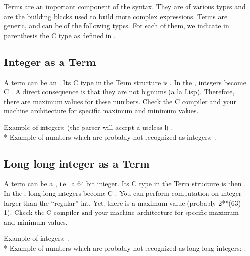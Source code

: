 Terms are an important component of the \COPRS{} syntax. They  are of various
types and are the building blocks used to build more complex
expressions.  Terms are generic, and can be of the following types. For each of
them, we indicate in parenthesis the C type as defined in
.



\subsection{Integer as a Term}


A term can be an . Its C type in the Term structure is
. In the \CPK{}, integers become C . A
direct consequence is that they are not bignums (a la Lisp). Therefore,
there are maximum values for these numbers. Check the C compiler and
your machine architecture for specific maximum and minimum values.

Example of integers: (the parser will accept a useless l) . \\*
Example of numbers which are probably not recognized as integers:
.

\subsection{Long long integer as a Term}

A term can be a , i.e.\ a 64 bit integer.  Its C
type in the Term structure is then . In the \CPK{}, long
long integers become C . You can perform computation
on integer larger than the ``regular'' int. Yet, there is a maximum value
(probably 2**(63) - 1). Check the C compiler and your machine architecture
for specific maximum and minimum values.

Example of integers: . \\*
Example of numbers which are probably not recognized as long long integers:
.

